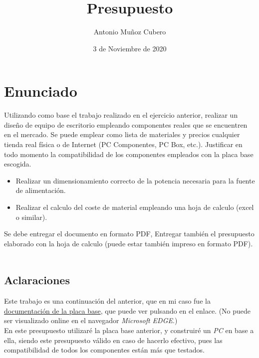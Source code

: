 \documentclass{article}
\title{Presupuesto}
\author{Antonio Muñoz Cubero}
\date{3 de Noviembre de 2020}
\begin{document}
  \maketitle
  \pagestyle{fancy}
  
  \newpage
    \tableofcontents
  
  \newpage

  \newpage
    \section{Enunciado}
      Utilizando como base el trabajo realizado en el ejercicio anterior, realizar un diseño de equipo de escritorio empleando componentes reales que se encuentren en el mercado. Se puede emplear como lista de materiales y precios cualquier tienda real física o de Internet (PC Componentes, PC Box, etc.). Justificar en todo momento la compatibilidad de los componentes empleados con la placa base escogida.
      \begin{itemize}
        \item Realizar un dimensionamiento correcto de la potencia necesaria para la fuente de alimentación.
        \item Realizar el calculo del coste de material empleando una hoja de calculo (excel o similar).
      \end{itemize}
      Se debe entregar el documento en formato PDF, Entregar también el presupuesto elaborado con la hoja de calculo (puede estar también impreso en formato PDF).
      \\\\
      \subsection{Aclaraciones}
      Este trabajo es una continuación del anterior, que en mi caso fue la \href{https://github.com/ErTonix12/DAM/blob/main/1%C2%BA/SI/Placa_Base_Documentaci%C3%B3n/build/Placa_Base_Documentacion.pdf}{documentación de la placa base}, que puede ver pulsando en el enlace. (No puede ser visualizado online en el navegador \textit{Microsoft EDGE}.)
      \\
      En este presupuesto utilizaré la placa base anterior, y construiré un \textit{PC} en base a ella, siendo este presupuesto válido en caso de hacerlo efectivo, pues las compatibilidad de todos los componentes están más que testados.
  \newpage
\end{document}
